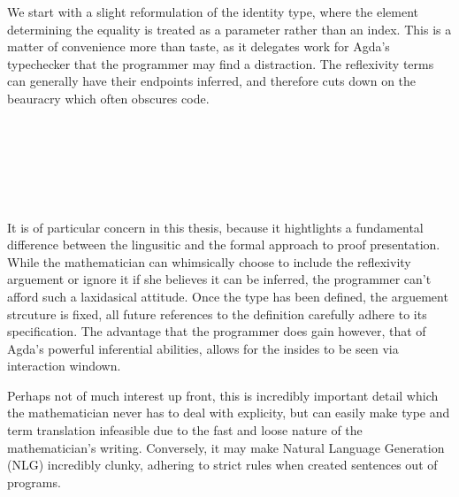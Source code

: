 \documentclass[11pt, a4paper]{article}
\begin{document}
We start with a slight reformulation of the identity type, where the element
determining the equality is treated as a parameter rather than an index. This
is a matter of convenience more than taste, as it delegates work for Agda's
typechecker that the programmer may find a distraction. The reflexivity terms
can generally have their endpoints inferred, and therefore cuts down on the
beauracry which often obscures code. 

\begin{code}%
\>[0]\<%
\\
\>[0][@{}l@{\AgdaIndent{1}}]%
\>[2]\AgdaSpace{}%
\AgdaSpace{}%
\AgdaSymbol{\{}\AgdaSpace{}%
\AgdaSymbol{:}\AgdaSpace{}%
\AgdaSymbol{\}}\AgdaSpace{}%
\AgdaSymbol{(}\AgdaSpace{}%
\AgdaSymbol{:}\AgdaSpace{}%
\AgdaSymbol{)}\AgdaSpace{}%
\AgdaSymbol{:}\AgdaSpace{}%
\AgdaSpace{}%
\AgdaSpace{}%
\AgdaSpace{}%
\<%
\\
\>[2][@{}l@{\AgdaIndent{0}}]%
\>[4]\AgdaSpace{}%
\AgdaSymbol{:}\AgdaSpace{}%
\AgdaSpace{}%
\AgdaSpace{}%
\<%
\\
%
\\[\AgdaEmptyExtraSkip]%
%
\>[2]\AgdaSpace{}%
\AgdaSpace{}%
\<%
\\
\>[0]\<%
\end{code}

It is of particular concern in this thesis, because it hightlights a
fundamental difference between the lingusitic and the formal approach to proof
presentation.  While the mathematician can whimsically choose to include the
reflexivity arguement or ignore it if she believes it can be inferred, the
programmer can't afford such a laxidasical attitude. Once the type has been
defined, the arguement strcuture is fixed, all future references to the
definition carefully adhere to its specification. The advantage that the
programmer does gain however, that of Agda's powerful inferential abilities,
allows for the insides to be seen via interaction windown. 

Perhaps not of much interest up front, this is incredibly important detail
which the mathematician never has to deal with explicity, but can easily make
type and term translation infeasible due to the fast and loose nature of the
mathematician's writing. Conversely, it may make Natural Language Generation
(NLG) incredibly clunky, adhering to strict rules when created sentences out of
programs. 
\end{document}
